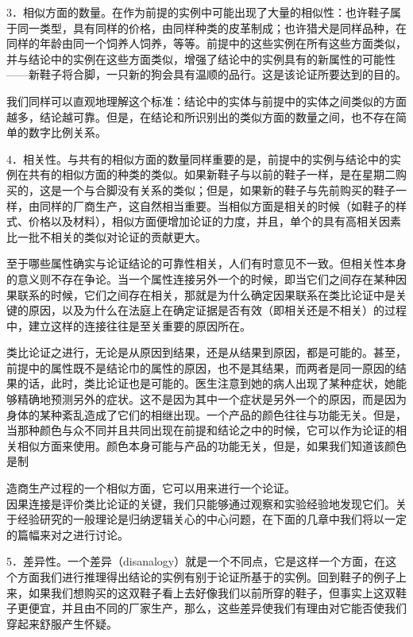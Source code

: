3．相似方面的数量。在作为前提的实例中可能出现了大量的相似性：也许鞋子属于同一类型，具有同样的价格，由同样种类的皮革制成；也许猎犬是同样品种，在同样的年龄由同一个饲养人饲养，等等。前提中的这些实例在所有这些方面类似，并与结论中的实例在这些方面类似，增强了结论中的实例具有的新属性的可能性——新鞋子将合脚，一只新的狗会具有温顺的品行。这是该论证所要达到的目的。

我们同样可以直观地理解这个标准：结论中的实体与前提中的实体之间类似的方面越多，结论越可靠。但是，在结论和所识别出的类似方面的数量之间，也不存在简单的数字比例关系。

4．相关性。与共有的相似方面的数量同样重要的是，前提中的实例与结论中的实例在共有的相似方面的种类的类似。如果新鞋子与以前的鞋子一样，是在星期二购买的，这是一个与合脚没有关系的类似；但是，如果新的鞋子与先前购买的鞋子一样，由同样的厂商生产，这自然相当重要。当相似方面是相关的时候（如鞋子的样式、价格以及材料），相似方面便增加论证的力度，并且，单个的具有高相关因素比一批不相关的类似对论证的贡献更大。

至于哪些属性确实与论证结论的可靠性相关，人们有时意见不一致。但相关性本身的意义则不存在争论。当一个属性连接另外一个的时候，即当它们之间存在某种因果联系的时候，它们之间存在相关，那就是为什么确定因果联系在类比论证中是关键的原因，以及为什么在法庭上在确定证据是否有效（即相关还是不相关）的过程中，建立这样的连接往往是至关重要的原因所在。

类比论证之进行，无论是从原因到结果，还是从结果到原因，都是可能的。甚至，前提中的属性既不是结论巾的属性的原因，也不是其结果，而两者是同一原因的结果的话，此时，类比论证也是可能的。医生注意到她的病人出现了某种症状，她能够精确地预测另外的症状。这不是因为其中一个症状是另外一个的原因，而是因为身体的某种紊乱造成了它们的相继出现。一个产品的颜色往往与功能无关。但是，当那种颜色与众不同并且共同出现在前提和结论之中的时候，它可以作为论证的相关相似方面来使用。颜色本身可能与产品的功能无关，但是，如果我们知道该颜色是制

造商生产过程的一个相似方面，它可以用来进行一个论证。\\
因果连接是评价类比论证的关键，我们只能够通过观察和实验经验地发现它们。关于经验研究的一般理论是归纳逻辑关心的中心问题，在下面的几章中我们将以一定的篇幅来对之进行讨论。

5．差异性。一个差异（disanalogy）就是一个不同点，它是这样一个方面，在这个方面我们进行推理得出结论的实例有别于论证所基于的实例。回到鞋子的例子上来，如果我们想购买的这双鞋子看上去好像我们以前所穿的鞋子，但事实上这双鞋子更便宜，并且由不同的厂家生产，那么，这些差异使我们有理由对它能否使我们穿起来舒服产生怀疑。

